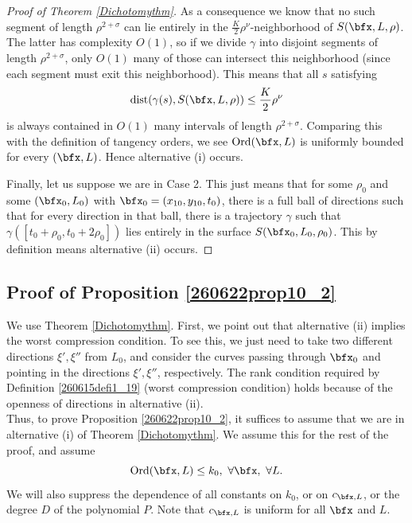 \documentclass{article}
\numberwithin{equation}{section}
\theoremstyle{plain}
\begin{document}
\begin{proof}[Proof of Theorem \ref{Dichotomythm}]
As a consequence we know that no such segment of length $\rho^{2+\sigma}$ can lie entirely in the $\frac{K}{2}\rho^{\nu}$-neighborhood of $S(\bfx, L, \rho)$. The latter has complexity $O(1)$, so if we divide $\gamma$ into disjoint segments of length $\rho^{2+\sigma}$, only $O(1)$ many of those can intersect this neighborhood (since each segment must exit this neighborhood). This means that all $s$ satisfying 
\begin{equation}
    \text{dist} (\gamma(s), S(\bfx, L, \rho))\leq \frac{K}{2}\rho^{\nu}
\end{equation}
is always contained in $O(1)$ many intervals of length $\rho^{2+\sigma}$. Comparing this with the definition of tangency orders, we see $\mathrm{Ord} (\bfx, L)$ is uniformly bounded for every $(\bfx, L)$. Hence alternative (i) occurs.

Finally, let us suppose we are in Case 2. This just means that for some $\rho_0$ and some $(\bfx_0, L_0)$ with $\bfx_0 = (x_{10}, y_{10}, t_0)$, there is a full ball of directions such that for every direction in that ball, there is a trajectory $\gamma$ such that $\gamma([t_0+\rho_0, t_0+2\rho_0])$ lies entirely in the surface $S(\bfx_0, L_0, \rho_0)$. This by definition means alternative (ii) occurs.



\end{proof}



\subsection{Proof of Proposition \ref{260622prop10_2}}




We use Theorem \ref{Dichotomythm}. First, we point out that alternative (ii) implies the worst compression condition.  To see this, we just need to take two different directions $\xi', \xi''$ from $L_0$, and consider the curves passing through $\bfx_0$ and pointing in the directions $\xi', \xi''$, respectively. The rank condition required by Definition \ref{260615defi1_19} (worst compression condition) holds because of the openness of directions in alternative (ii).\\

Thus, to prove Proposition \ref{260622prop10_2}, it suffices to assume that we are in alternative (i) of Theorem \ref{Dichotomythm}. We assume this for the rest of the proof, and assume 
\begin{equation}
    \mathrm{Ord}(\bfx, L)\leq k_0,\  \forall \bfx, \ \forall L.
\end{equation}
We will also suppress the dependence of all constants on $k_0$, or on $c_{\bfx, L}$, or the degree $D$ of the polynomial $P$. Note that $c_{\bfx, L}$ is uniform for all $\bfx$ and $L$.
\end{document}
